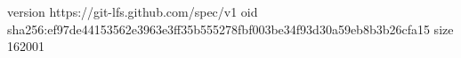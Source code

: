 version https://git-lfs.github.com/spec/v1
oid sha256:ef97de44153562e3963e3ff35b555278fbf003be34f93d30a59eb8b3b26cfa15
size 162001
